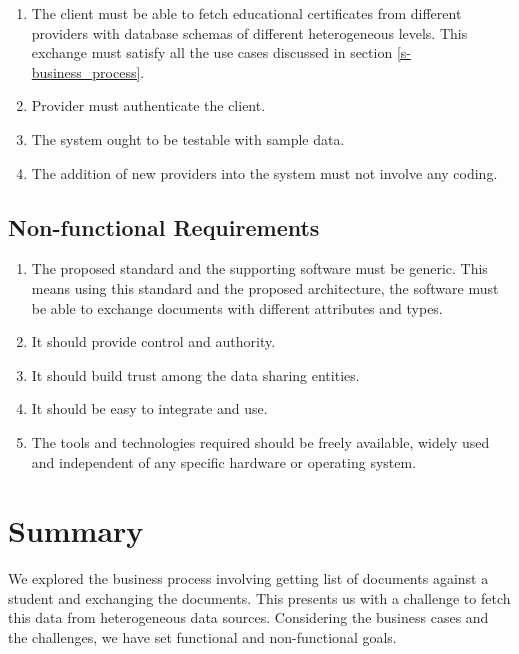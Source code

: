 \documentclass[12pt,a4paper,oneside]{book}
\begin{document}
    \begin{enumerate}

		\item The client must be able to fetch educational certificates from different providers with database schemas of different heterogeneous levels. This exchange must satisfy all the use cases discussed in section \ref{s-business_process}.

		\item Provider must authenticate the client.
	
		\item The system ought to be testable with sample data.	
		
		\item The addition of new providers into the system must not involve any coding.

	\end{enumerate} 

    \subsection{Non-functional Requirements}

	\begin{enumerate}

		\item The proposed standard and the supporting software must be generic. This means using this standard and the proposed architecture, the software must be able to exchange documents with different attributes and types. 

		\item It should provide control and authority.
	
		\item It should build trust among the data sharing entities. 	
		
		\item It should be easy to integrate and use.
		
		\item The tools and technologies required should be freely available, widely used and independent of any specific hardware or operating system.

	\end{enumerate}

\section{Summary}
We explored the business process involving getting list of documents against a student and exchanging the documents. This presents us with a challenge to fetch this data from heterogeneous data sources. Considering the business cases and the challenges, we have set functional and non-functional goals.   
\end{document}
